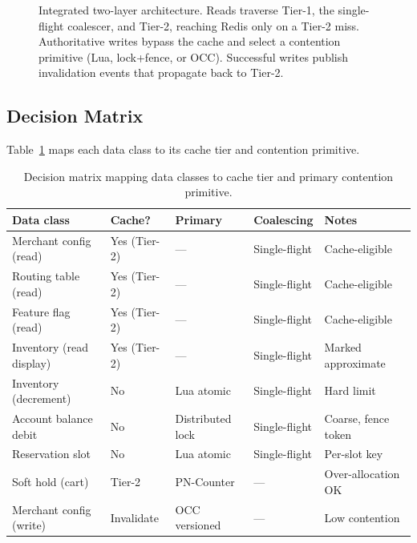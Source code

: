 \begin{figure}[h]
{%
}
\caption{Integrated two-layer architecture. Reads traverse Tier-1, the single-flight coalescer, and Tier-2, reaching Redis only on a Tier-2 miss. Authoritative writes bypass the cache and select a contention primitive (Lua, lock+fence, or OCC). Successful writes publish invalidation events that propagate back to Tier-2.}
\label{fig:contention}
\end{figure}

\subsection{Decision Matrix}
Table~\ref{tab:matrix} maps each data class to its cache tier and contention primitive.

\begin{table}[h]
\centering
\footnotesize
\setlength{\tabcolsep}{4pt}
\renewcommand{\arraystretch}{1.15}
\begin{tabular}{p{3.4cm}p{1.7cm}p{2.5cm}p{2.0cm}p{2.6cm}}
\toprule
\textbf{Data class} & \textbf{Cache?} & \textbf{Primary} & \textbf{Coalescing} & \textbf{Notes} \\
\midrule
Merchant config (read)   & Yes (Tier-2) & ---              & Single-flight & Cache-eligible \\
Routing table (read)     & Yes (Tier-2) & ---              & Single-flight & Cache-eligible \\
Feature flag (read)      & Yes (Tier-2) & ---              & Single-flight & Cache-eligible \\
Inventory (read display) & Yes (Tier-2) & ---              & Single-flight & Marked approximate \\
Inventory (decrement)    & No           & Lua atomic       & Single-flight & Hard limit \\
Account balance debit    & No           & Distributed lock & Single-flight & Coarse, fence token \\
Reservation slot         & No           & Lua atomic       & Single-flight & Per-slot key \\
Soft hold (cart)         & Tier-2       & PN-Counter       & ---           & Over-allocation OK \\
Merchant config (write)  & Invalidate   & OCC versioned    & ---           & Low contention \\
\bottomrule
\end{tabular}
\caption{Decision matrix mapping data classes to cache tier and primary contention primitive.}
\label{tab:matrix}
\end{table}

